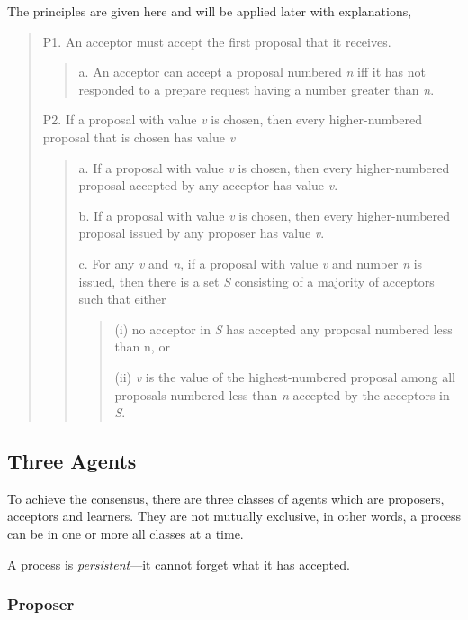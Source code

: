 \documentclass[12pt, a4paper]{article}
\begin{document}
The principles are given here and will be applied later with explanations,
\begin{quote}
  P1. An acceptor must accept the first proposal that it receives.
  \begin{quote}
    a. An acceptor can accept a proposal numbered \textit{n} 
      iff it has not responded to a prepare request 
      having a number greater than \textit{n}.
  \end{quote}
  P2. If a proposal with value \textit{v} is chosen, 
    then every higher-numbered proposal that is chosen has value \textit{v}
    \begin{quote}
      a. If a proposal with value \textit{v} is chosen, 
        then every higher-numbered proposal accepted 
        by any acceptor has value \textit{v}.
        
      b. If a proposal with value \textit{v} is chosen, 
        then every higher-numbered proposal issued 
        by any proposer has value \textit{v}.

      c. For any \textit{v} and \textit{n}, 
        if a proposal with value \textit{v} 
        and number \textit{n} is issued,
        then there is a set \textit{S} consisting of 
        a majority of acceptors such that either 
          \begin{quote}
            (i) no acceptor in \textit{S} has accepted 
              any proposal numbered less than n, or 
              
            (ii) \textit{v} is the value of 
              the highest-numbered proposal among 
              all proposals numbered less than 
              \textit{n} accepted by the acceptors in \textit{S}.
          \end{quote}
  \end{quote}
\end{quote}

\subsection{Three Agents}

To achieve the consensus, there are three classes of agents 
which are proposers, acceptors and learners. 
They are not mutually exclusive, in other words, a process can be 
in one or more all classes at a time.

A process is \textit{persistent}---it cannot forget what it has accepted.

  \subsubsection{Proposer}
\end{document}
